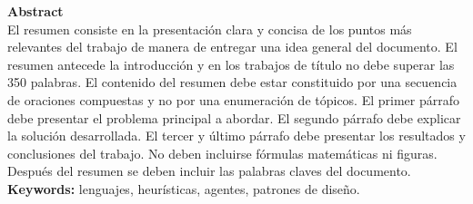 
\noindent
\Large{\textbf{Abstract}}\\

\normalsize
El resumen consiste en la presentación clara y concisa de los puntos más
relevantes del trabajo de manera de entregar una idea general del documento. El
resumen antecede la introducción y en los trabajos de título no debe superar las
350 palabras. El contenido del resumen debe estar constituido por una secuencia
de oraciones compuestas y no por una enumeración de tópicos. El primer párrafo
debe presentar el problema principal a abordar. El segundo párrafo debe explicar
la solución desarrollada. El tercer y último párrafo debe presentar los
resultados y conclusiones del trabajo. No deben incluirse fórmulas matemáticas
ni figuras. Después del resumen se deben incluir las palabras claves del
documento.\\

\noindent
\textbf{Keywords:} lenguajes, heurísticas, agentes, patrones de diseño.

